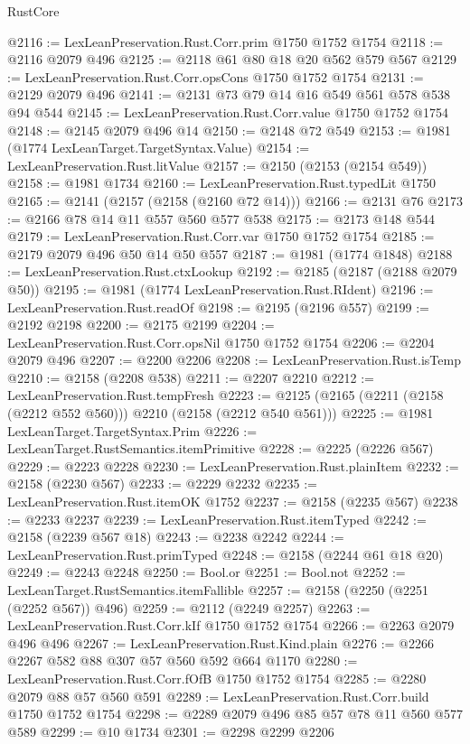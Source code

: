 \begin{lexlean}{RustCore}
\begin{coremodule}
@2116 := LexLeanPreservation.Rust.Corr.prim @1750 @1752 @1754
@2118 := @2116 @2079 @496
@2125 := @2118 @61 @80 @18 @20 @562 @579 @567
@2129 := LexLeanPreservation.Rust.Corr.opsCons @1750 @1752 @1754
@2131 := @2129 @2079 @496
@2141 := @2131 @73 @79 @14 @16 @549 @561 @578 @538 @94 @544
@2145 := LexLeanPreservation.Rust.Corr.value @1750 @1752 @1754
@2148 := @2145 @2079 @496 @14
@2150 := @2148 @72 @549
@2153 := @1981 (@1774 LexLeanTarget.TargetSyntax.Value)
@2154 := LexLeanPreservation.Rust.litValue
@2157 := @2150 (@2153 (@2154 @549))
@2158 := @1981 @1734
@2160 := LexLeanPreservation.Rust.typedLit @1750
@2165 := @2141 (@2157 (@2158 (@2160 @72 @14)))
@2166 := @2131 @76
@2173 := @2166 @78 @14 @11 @557 @560 @577 @538
@2175 := @2173 @148 @544
@2179 := LexLeanPreservation.Rust.Corr.var @1750 @1752 @1754
@2185 := @2179 @2079 @496 @50 @14 @50 @557
@2187 := @1981 (@1774 @1848)
@2188 := LexLeanPreservation.Rust.ctxLookup
@2192 := @2185 (@2187 (@2188 @2079 @50))
@2195 := @1981 (@1774 LexLeanPreservation.Rust.RIdent)
@2196 := LexLeanPreservation.Rust.readOf
@2198 := @2195 (@2196 @557)
@2199 := @2192 @2198
@2200 := @2175 @2199
@2204 := LexLeanPreservation.Rust.Corr.opsNil @1750 @1752 @1754
@2206 := @2204 @2079 @496
@2207 := @2200 @2206
@2208 := LexLeanPreservation.Rust.isTemp
@2210 := @2158 (@2208 @538)
@2211 := @2207 @2210
@2212 := LexLeanPreservation.Rust.tempFresh
@2223 := @2125 (@2165 (@2211 (@2158 (@2212 @552 @560))) @2210 (@2158 (@2212 @540 @561)))
@2225 := @1981 LexLeanTarget.TargetSyntax.Prim
@2226 := LexLeanTarget.RustSemantics.itemPrimitive
@2228 := @2225 (@2226 @567)
@2229 := @2223 @2228
@2230 := LexLeanPreservation.Rust.plainItem
@2232 := @2158 (@2230 @567)
@2233 := @2229 @2232
@2235 := LexLeanPreservation.Rust.itemOK @1752
@2237 := @2158 (@2235 @567)
@2238 := @2233 @2237
@2239 := LexLeanPreservation.Rust.itemTyped
@2242 := @2158 (@2239 @567 @18)
@2243 := @2238 @2242
@2244 := LexLeanPreservation.Rust.primTyped
@2248 := @2158 (@2244 @61 @18 @20)
@2249 := @2243 @2248
@2250 := Bool.or
@2251 := Bool.not
@2252 := LexLeanTarget.RustSemantics.itemFallible
@2257 := @2158 (@2250 (@2251 (@2252 @567)) @496)
@2259 := @2112 (@2249 @2257)
@2263 := LexLeanPreservation.Rust.Corr.kIf @1750 @1752 @1754
@2266 := @2263 @2079 @496 @496
@2267 := LexLeanPreservation.Rust.Kind.plain
@2276 := @2266 @2267 @582 @88 @307 @57 @560 @592 @664 @1170
@2280 := LexLeanPreservation.Rust.Corr.fOfB @1750 @1752 @1754
@2285 := @2280 @2079 @88 @57 @560 @591
@2289 := LexLeanPreservation.Rust.Corr.build @1750 @1752 @1754
@2298 := @2289 @2079 @496 @85 @57 @78 @11 @560 @577 @589
@2299 := @10 @1734
@2301 := @2298 @2299 @2206

\end{coremodule}
\end{lexlean}
